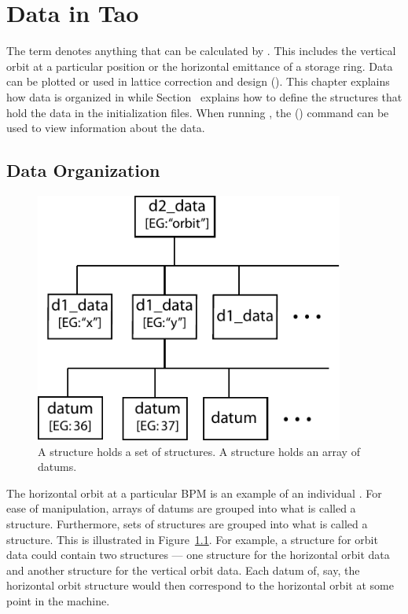 \chapter{Data in Tao}
\label{c:data}

The term  denotes anything that can be calculated by
\tao. This includes the vertical orbit at a particular position or the
horizontal emittance of a storage ring. Data can be plotted or used in
lattice correction and design (). This chapter explains
how data is organized in \tao while Section~
explains how to define the structures that hold the data in the
initialization files. When running \tao, the 
() command can be used to view information about the
data.


\section{Data Organization}
\label{s:data.org}

\begin{figure}
  \centering
  \includegraphics[width=4in]{data-tree.pdf}
  \caption[Data tree structure]
{A  structure holds a set of  structures. 
A  structure holds an array of datums.}
  \label{f:data.tree}
\end{figure}

The horizontal orbit at a particular BPM is an example of an
individual .  For ease of manipulation, arrays of datums are
grouped into what is called a  structure. Furthermore,
sets of  structures are grouped into what is called a
 structure.  This is illustrated in
Figure~\ref{f:data.tree}.  For example, a  structure for
orbit data could contain two  structures --- one
 structure for the horizontal orbit data and another
 structure for the vertical orbit data. Each datum of,
say, the horizontal orbit  structure would then correspond
to the horizontal orbit at some point in the machine.


